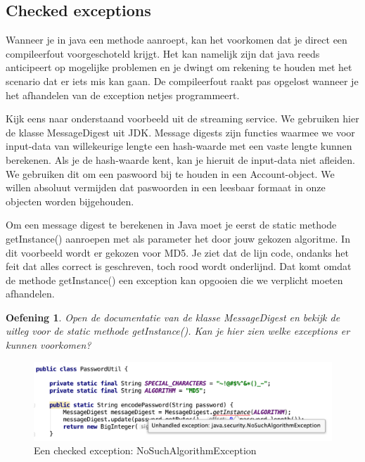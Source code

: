 \documentclass{tstextbook}
\newtheorem{envoefening}{Oefening}[chapter]
\newenvironment{oefening}
               {\begin{boxexercise}\begin{envoefening}}
               {\end{envoefening}\end{boxexercise}}
\begin{document}
\subsection{Checked exceptions}

Wanneer je in java een methode aanroept, kan het voorkomen dat je direct een compileerfout voorgeschoteld krijgt. Het kan namelijk zijn dat java reeds anticipeert op mogelijke problemen en je dwingt om rekening te houden met het scenario dat er iets mis kan gaan. De compileerfout raakt pas opgelost wanneer je het afhandelen van de exception netjes programmeert.

Kijk eens naar onderstaand voorbeeld uit de streaming service.
We gebruiken hier de klasse MessageDigest uit JDK. Message digests zijn functies waarmee we voor input-data van willekeurige lengte een hash-waarde met een vaste lengte kunnen berekenen.  Als je de hash-waarde kent, kan je hieruit de input-data niet afleiden. We gebruiken dit om een paswoord bij te houden in een Account-object. We willen absoluut vermijden dat paswoorden in een leesbaar formaat in onze objecten worden bijgehouden.

Om een message digest te berekenen in Java moet je eerst de static methode getInstance() aanroepen met als parameter het door jouw gekozen algoritme. In dit voorbeeld wordt er gekozen voor MD5. Je ziet dat de lijn code, ondanks het feit dat alles correct is geschreven, toch rood wordt onderlijnd. Dat komt omdat de methode getInstance() een exception kan opgooien die we verplicht moeten afhandelen.

\begin{oefening}
Open de documentatie van de klasse MessageDigest en bekijk de uitleg voor de static methode getInstance(). Kan je hier zien welke exceptions er kunnen voorkomen?
\end{oefening}

\begin{figure}[H]
\includegraphics[width=\linewidth]{images/h2/no_such_algorithm_exception.png}
\caption{Een checked exception: NoSuchAlgorithmException}
\label{fig:no_such_algorithm}
\end{figure}
\end{document}
